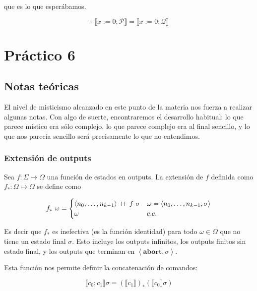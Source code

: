 \documentclass[a4paper, 12pt]{article}
\newcommand\doubleplus{+\kern-1.3ex+\kern0.8ex}
\begin{document}
que es lo que esperábamos.

\begin{equation*}
  \therefore  ~ \llbracket x:=0;\mathcal{P} \rrbracket = \llbracket
  x:=0;\mathcal{Q} \rrbracket
\end{equation*}

\pagebreak 

\section{Práctico 6}

\subsection{Notas teóricas}

El nivel de misticismo alcanzado en este punto de la materia nos fuerza a
realizar algunas notas. Con algo de suerte, encontraremos el desarrollo
habitual: lo que parece místico era sólo complejo, lo que parece complejo era
al final sencillo, y lo que nos parecía sencillo será precisamente lo que no
entendimos.

\subsubsection{Extensión de outputs}

Sea $f : \Sigma \mapsto \Omega$ una función de estados en outputs. La extensión
de $f$ definida como $f_* : \Omega \mapsto \Omega$ se define como

\begin{equation*}
  f_* ~ \omega = \begin{cases}
    \left<n_0, \ldots, n_{k-1} \right> \doubleplus f ~ \sigma & \omega =
    \left<n_0, \ldots, n_{k-1}, \sigma \right> \\ 
    \omega & c.c.
  \end{cases}
\end{equation*}

Es decir que $f_*$ es inefectiva (es la función identidad) para todo $\omega \in
\Omega$ que no tiene un estado final $\sigma$. Esto incluye los outputs infinitos, los
outputs finitos sin estado final, y los outputs que terminan en
$\left<\textbf{abort}, \sigma \right>$.

Esta función nos permite definir la concatenación de comandos:

\begin{equation*}
  \llbracket c_0;c_1 \rrbracket \sigma = \left( \llbracket c_1 \rrbracket
  \right)_* \left( \llbracket c_0 \rrbracket \sigma \right) 
\end{equation*}
\end{document}
